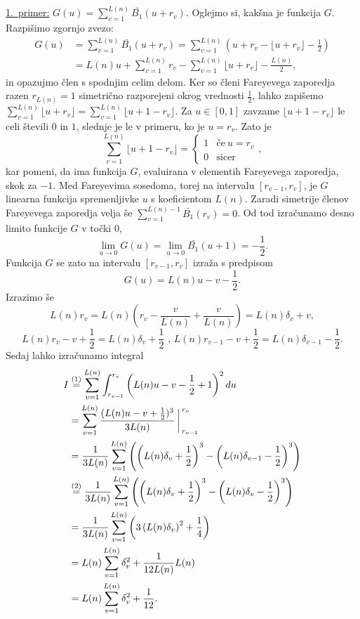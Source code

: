 \documentclass[mat1]{fmfdelo}
\begin{document}
\underline{1.~primer:} $G(u) = \sum_{v=1}^{L(n)} \bar{B_{1}}(u+r_v)$.
Oglejmo si, kakšna je funkcija $G$. Razpišimo zgornjo zvezo:
\begin{align}
G(u) &= \sum_{v=1}^{L(n)} \bar{B_{1}}(u+r_v) = \sum_{v=1}^{L(n)} \left(u+r_v - \lfloor u+r_v \rfloor - \frac{1}{2} \right) \nonumber \\
       &= L(n)u + \sum_{v=1}^{L(n)}r_v - \sum_{v=1}^{L(n)} \lfloor u+r_v \rfloor - \frac{L(n)}{2},
\end{align}
in opazujmo člen s spodnjim celim delom. Ker so členi Fareyevega zaporedja razen $r_{L(n)}=1$ simetrično razporejeni okrog vrednosti $\frac{1}{2}$, lahko zapišemo $\sum_{v=1}^{L(n)} \lfloor u+r_v \rfloor = \sum_{v=1}^{L(n)} \lfloor u+1-r_v \rfloor$. Za $u\in[0,1]$ zavzame $\lfloor u+1-r_v \rfloor$ le celi števili $0$ in $1$, slednje je le v primeru, ko je $u=r_{v}$. Zato je 
\[
\sum_{v=1}^{L(n)} \lfloor u+1-r_v \rfloor = \left\{
\begin{array}{rl}
	1 & \textrm{če}\ u = r_{v}\\
	0 & \textrm{sicer}
\end{array},
\right.
\]
kar pomeni, da ima funkcija $G$, evaluirana v elementih Fareyevega zaporedja, skok za $-1$. Med Fareyevima sosedoma, torej na intervalu $[r_{v-1},r_{v}]$, je $G$ linearna funkcija spremenljivke $u$ s koeficientom $L(n)$.
Zaradi simetrije členov Fareyevega zaporedja velja še $\sum_{v=1}^{L(n)-1} \bar{B_{1}}(r_v) = 0$. Od tod izračunamo desno limito funkcije $G$ v točki $0$,
\[ \lim_{u \to 0} G(u) = \lim_{u \to 0} \bar{B_{1}}(u+1) = -\frac{1}{2}. \]
Funkcija $G$ se zato na intervalu $[r_{v-1},r_{v}]$ izraža s predpisom
\[ G(u) = L(n)u - v - \frac{1}{2}. \]
%
Izrazimo še 
\[ L(n)r_{v} = L(n) \left( r_{v}-\frac{v}{L(n)}+\frac{v}{L(n)} \right) = L(n) \delta_{v} + v, \]
\[ L(n)r_{v}-v+\frac{1}{2} = L(n) \delta_{v} + \frac{1}{2} \textrm{ , } L(n)r_{v-1}-v+\frac{1}{2} = L(n) \delta_{v-1} - \frac{1}{2}. \]
%
Sedaj lahko izračunamo integral 
\begin{align}
\label{Eq:I1}
I &\stackrel{(1)}{=} \sum_{v=1}^{L(n)} \int_{r_{v-1}}^{r_{v}} \left( L(n)u-v-\frac{1}{2}+1 \right)^2 du \nonumber \\
  &= \sum_{v=1}^{L(n)} \frac{(L(n)u-v+\frac{1}{2})^3}{3L(n)} \bigg \arrowvert_{r_{v-1}}^{r_{v}} \nonumber \\
  &= \frac{1}{3L(n)} \sum_{v=1}^{L(n)} \left( \left(L(n) \delta_{v} + \frac{1}{2} \right)^3 - \left(L(n) \delta_{v-1} - \frac{1}{2} \right)^3 \right) \nonumber \\
  &\stackrel{(2)}{=} \frac{1}{3L(n)} \sum_{v=1}^{L(n)} \left( \left(L(n) \delta_{v} + \frac{1}{2} \right)^3 - \left(L(n) \delta_{v} - \frac{1}{2} \right)^3 \right) \nonumber \\
  &= \frac{1}{3L(n)} \sum_{v=1}^{L(n)} \left(3 \left(L(n) \delta_{v} \right)^2 + \frac{1}{4} \right) \nonumber \\
  &= L(n) \sum_{v=1}^{L(n)} \delta_{v}^2 + \frac{1}{12L(n)} L(n) \nonumber \\
  &= L(n) \sum_{v=1}^{L(n)} \delta_{v}^2 + \frac{1}{12}.
\end{align}
\end{document}
